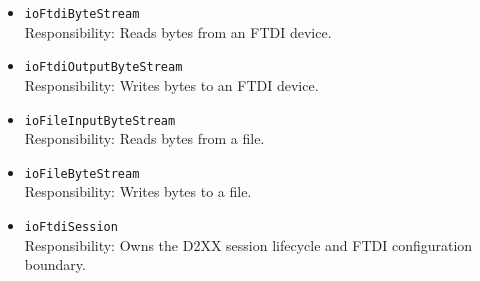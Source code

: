 \begin{itemize}
        \item \texttt{ioFtdiByteStream} \\
        Responsibility: Reads bytes from an FTDI device.

        \item \texttt{ioFtdiOutputByteStream} \\
        Responsibility: Writes bytes to an FTDI device.

        \item \texttt{ioFileInputByteStream} \\
        Responsibility: Reads bytes from a file.

        \item \texttt{ioFileByteStream} \\
        Responsibility: Writes bytes to a file.

        \item \texttt{ioFtdiSession} \\
        Responsibility: Owns the D2XX session lifecycle and FTDI configuration boundary.
    \end{itemize}

